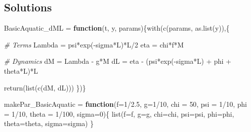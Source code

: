 \documentclass[
]{book}
\newenvironment{Shaded}{\begin{snugshade}}{\end{snugshade}}
\newcommand{\AttributeTok}[1]{\textcolor[rgb]{0.77,0.63,0.00}{#1}}
\newcommand{\CommentTok}[1]{\textcolor[rgb]{0.56,0.35,0.01}{\textit{#1}}}
\newcommand{\ControlFlowTok}[1]{\textcolor[rgb]{0.13,0.29,0.53}{\textbf{#1}}}
\newcommand{\DecValTok}[1]{\textcolor[rgb]{0.00,0.00,0.81}{#1}}
\newcommand{\FloatTok}[1]{\textcolor[rgb]{0.00,0.00,0.81}{#1}}
\newcommand{\FunctionTok}[1]{\textcolor[rgb]{0.00,0.00,0.00}{#1}}
\newcommand{\NormalTok}[1]{#1}
\newcommand{\OtherTok}[1]{\textcolor[rgb]{0.56,0.35,0.01}{#1}}
\newcommand{\SpecialCharTok}[1]{\textcolor[rgb]{0.00,0.00,0.00}{#1}}
\begin{document}
\hypertarget{solutions-1}{%
\subsection{Solutions}\label{solutions-1}}

\begin{Shaded}
\begin{Highlighting}[]
\NormalTok{BasicAquatic\_dML }\OtherTok{=} \ControlFlowTok{function}\NormalTok{(t, y, params)\{}\FunctionTok{with}\NormalTok{(}\FunctionTok{c}\NormalTok{(params, }\FunctionTok{as.list}\NormalTok{(y)),\{}
   
  \CommentTok{\# Terms }
\NormalTok{  Lambda }\OtherTok{=}\NormalTok{ psi}\SpecialCharTok{*}\FunctionTok{exp}\NormalTok{(}\SpecialCharTok{{-}}\NormalTok{sigma}\SpecialCharTok{*}\NormalTok{L)}\SpecialCharTok{*}\NormalTok{L}\SpecialCharTok{/}\DecValTok{2} 
\NormalTok{  eta }\OtherTok{=}\NormalTok{ chi}\SpecialCharTok{*}\NormalTok{f}\SpecialCharTok{*}\NormalTok{M }
   
  \CommentTok{\# Dynamics }
\NormalTok{  dM }\OtherTok{=}\NormalTok{ Lambda }\SpecialCharTok{{-}}\NormalTok{ g}\SpecialCharTok{*}\NormalTok{M}
\NormalTok{  dL }\OtherTok{=}\NormalTok{ eta }\SpecialCharTok{{-}}\NormalTok{ (psi}\SpecialCharTok{*}\FunctionTok{exp}\NormalTok{(}\SpecialCharTok{{-}}\NormalTok{sigma}\SpecialCharTok{*}\NormalTok{L) }\SpecialCharTok{+}\NormalTok{ phi }\SpecialCharTok{+}\NormalTok{ theta}\SpecialCharTok{*}\NormalTok{L)}\SpecialCharTok{*}\NormalTok{L }
  
  \FunctionTok{return}\NormalTok{(}\FunctionTok{list}\NormalTok{(}\FunctionTok{c}\NormalTok{(dM, dL)))}
\NormalTok{\})\} }
\end{Highlighting}
\end{Shaded}

\begin{Shaded}
\begin{Highlighting}[]
\NormalTok{makePar\_BasicAquatic }\OtherTok{=} \ControlFlowTok{function}\NormalTok{(}\AttributeTok{f=}\DecValTok{1}\SpecialCharTok{/}\FloatTok{2.5}\NormalTok{, }\AttributeTok{g=}\DecValTok{1}\SpecialCharTok{/}\DecValTok{10}\NormalTok{, }\AttributeTok{chi =} \DecValTok{50}\NormalTok{, }\AttributeTok{psi =} \DecValTok{1}\SpecialCharTok{/}\DecValTok{10}\NormalTok{, }\AttributeTok{phi =} \DecValTok{1}\SpecialCharTok{/}\DecValTok{10}\NormalTok{, }\AttributeTok{theta =} \DecValTok{1}\SpecialCharTok{/}\DecValTok{100}\NormalTok{, }\AttributeTok{sigma=}\DecValTok{0}\NormalTok{)\{}
  \FunctionTok{list}\NormalTok{(}\AttributeTok{f=}\NormalTok{f, }\AttributeTok{g=}\NormalTok{g, }\AttributeTok{chi=}\NormalTok{chi, }\AttributeTok{psi=}\NormalTok{psi, }\AttributeTok{phi=}\NormalTok{phi, }\AttributeTok{theta=}\NormalTok{theta, }\AttributeTok{sigma=}\NormalTok{sigma)}
\NormalTok{\}}
\end{Highlighting}
\end{Shaded}
\end{document}
